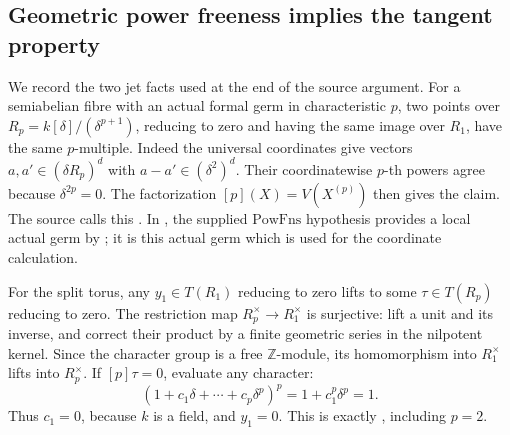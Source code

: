 \subsection{Geometric power freeness implies the tangent property}
\label{subsec:faithful-geompf-to-tanpf}

We record the two jet facts used at the end of the source
argument.
For a semiabelian fibre with an actual formal germ in
characteristic \(p\), two points over
\(R_p=k[\delta]/(\delta^{p+1})\), reducing to zero and
having the same image over \(R_1\), have the same
\(p\)-multiple.
Indeed the universal coordinates give vectors
\(a,a'\in(\delta R_p)^d\) with \(a-a'\in(\delta^2)^d\).
Their coordinatewise \(p\)-th powers agree because
\(\delta^{2p}=0\).
The factorization \([p](X)=V(X^{(p)})\) then gives the claim.
The source calls this .
In , the supplied \(\mathrm{PowFns}\)
hypothesis provides a local actual germ by
; it is this actual germ
which is used for the coordinate calculation.

For the split torus, any \(y_1\in T(R_1)\) reducing to zero
lifts to some \(\tau\in T(R_p)\) reducing to zero.
The restriction map \(R_p^\times\to R_1^\times\) is
surjective: lift a unit and its inverse, and correct
their product by a finite geometric series in the
nilpotent kernel.
Since the character group is a free \(\mathbb Z\)-module,
its homomorphism into \(R_1^\times\) lifts into \(R_p^\times\).
If \([p]\tau=0\), evaluate any character:
\[
             (1+c_1\delta+\cdots+c_p\delta^p)^p
                                   =1+c_1^p\delta^p=1.
\]
Thus \(c_1=0\), because \(k\) is a field, and \(y_1=0\).
This is exactly , including \(p=2\).

